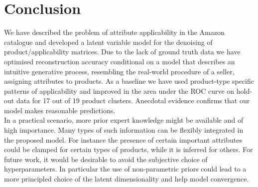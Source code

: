 \documentclass{article}
\begin{document}




\section{Conclusion}
\label{sec:org5d08bba}
We have described the problem of attribute applicability in the
Amazon catalogue and developed a latent variable model for the
denoising of product/applicability matrices.
Due to the lack of ground truth data we have optimised
reconstruction accuracy conditional on a model that describes an
intuitive generative process, resembling the real-world
procedure of a seller, assigning attributes to products.
As a baseline we have used product-type specific patterns of
applicability and improved in the area under the ROC curve on
hold-out data for 17 out of 19 product clusters.
Anecdotal evidence confirms that our model makes reasonable
predictions.\\
In a practical scenario, more prior expert knowledge
might be available and of high importance. Many types of such
information can be flexibly integrated in the proposed
model. For instance the presence of certain important attributes could be clamped
for certain types of products, while it is inferred for others.
For future work, it would be desirable to avoid the subjective
choice of hyperparameters. In particular the use of non-parametric
priors could lead to a more principled choice of the latent
dimensionality and help model convergence.
\end{document}

